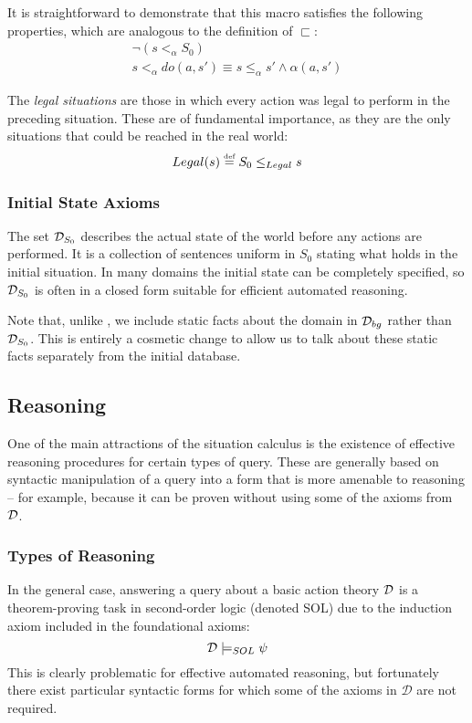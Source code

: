 It is straightforward to demonstrate that this macro satisfies the
following properties, which are analogous to the definition of $\sqsubset$:\begin{gather*}
\neg\left(s<_{\alpha}S_{0}\right)\\
s<_{\alpha}do(a,s')\equiv s\leq_{\alpha}s'\wedge\alpha(a,s')\end{gather*}


The \emph{legal situations} are those in which every action was legal
to perform in the preceding situation. These are of fundamental importance,
as they are the only situations that could be reached in the real
world:\[
Legal(s)\stackrel{\mbox{\tiny def}}{=} S_{0}\leq_{Legal}s\]



\subsubsection{Initial State Axioms}

The set $\mathcal{D}_{S_{0}}$ describes the actual state of the world before
any actions are performed. It is a collection of sentences uniform
in $S_{0}$ stating what holds in the initial situation. In many domains
the initial state can be completely specified, so $\mathcal{D}_{S_{0}}$ is
often in a closed form suitable for efficient automated reasoning.

Note that, unlike \citep{levesque98sc_foundations,pirri99contributions_sitcalc,reiter01kia},
we include static facts about the domain in $\mathcal{D}_{bg}$ rather than
$\mathcal{D}_{S_{0}}$. This is entirely a cosmetic change to allow us to
talk about these static facts separately from the initial database.


\subsection{Reasoning}

One of the main attractions of the situation calculus is the existence
of effective reasoning procedures for certain types of query. These
are generally based on syntactic manipulation of a query into a form
that is more amenable to reasoning -- for example, because it can
be proven without using some of the axioms from $\mathcal{D}$.


\subsubsection{Types of Reasoning}

In the general case, answering a query about a basic action theory
$\mathcal{D}$ is a theorem-proving task in second-order logic (denoted SOL)
due to the induction axiom included in the foundational axioms:\[
\mathcal{D}\models_{SOL}\psi\]
 This is clearly problematic for effective automated reasoning, but
fortunately there exist particular syntactic forms for which some
of the axioms in $\mathcal{D}$ are not required.

